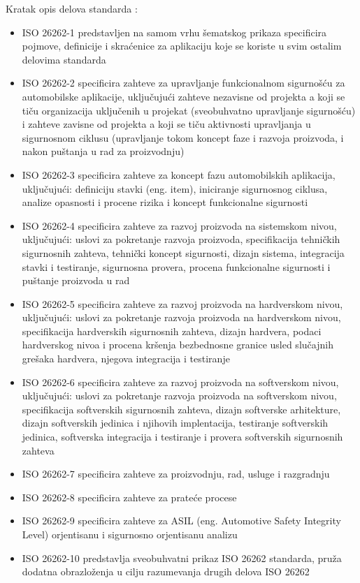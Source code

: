 \documentclass[a4paper]{article}
\begin{document}
Kratak opis delova standarda \cite{ref37}:
\begin{itemize}
  \item ISO 26262-1 predstavljen na samom vrhu šematskog prikaza specificira pojmove, definicije i skraćenice za aplikaciju koje se koriste u svim ostalim delovima standarda
  \item ISO 26262-2 specificira zahteve za upravljanje funkcionalnom sigurnošću za automobilske aplikacije, uključujući zahteve nezavisne od projekta a koji se tiču organizacija uključenih u projekat (sveobuhvatno upravljanje sigurnošću) i zahteve zavisne od projekta a koji se tiču aktivnosti upravljanja u sigurnosnom ciklusu (upravljanje tokom koncept faze i razvoja proizvoda, i nakon puštanja u rad za proizvodnju)
  \item ISO 26262-3 specificira zahteve za koncept fazu automobilskih aplikacija, uključujući: definiciju stavki (eng. item), iniciranje sigurnosnog ciklusa, analize opasnosti i procene rizika i koncept funkcionalne sigurnosti
  \item ISO 26262-4 specificira zahteve za razvoj proizvoda na sistemskom nivou, uključujući: uslovi za pokretanje razvoja proizvoda, specifikacija tehničkih sigurnosnih zahteva, tehnički koncept sigurnosti, dizajn sistema, integracija stavki i testiranje, sigurnosna provera, procena funkcionalne sigurnosti i puštanje proizvoda u rad
 \item ISO 26262-5 specificira zahteve za razvoj proizvoda na hardverskom nivou, uključujući: uslovi za pokretanje razvoja proizvoda na hardverskom nivou, specifikacija hardverskih sigurnosnih zahteva, dizajn hardvera, podaci hardverskog nivoa i procena kršenja bezbednosne granice usled slučajnih grešaka hardvera, njegova integracija i testiranje
 \item ISO 26262-6 specificira zahteve za razvoj proizvoda na softverskom nivou, uključujući: uslovi za pokretanje razvoja proizvoda na softverskom nivou, specifikacija softverskih sigurnosnih zahteva, dizajn softverske arhitekture, dizajn softverskih jedinica i njihovih implentacija, testiranje softverskih jedinica, softverska integracija i testiranje i provera softverskih sigurnosnih zahteva
 \item ISO 26262-7 specificira zahteve za proizvodnju, rad, usluge i razgradnju
 \item ISO 26262-8 specificira zahteve za prateće procese
 \item ISO 26262-9 specificira zahteve za ASIL (eng. Automotive Safety Integrity Level) orjentisanu i sigurnosno orjentisanu analizu
 \item ISO 26262-10 predstavlja sveobuhvatni prikaz ISO 26262 standarda, pruža dodatna obrazloženja u cilju razumevanja drugih delova ISO 26262
\end{itemize}
\bigbreak
\end{document}
